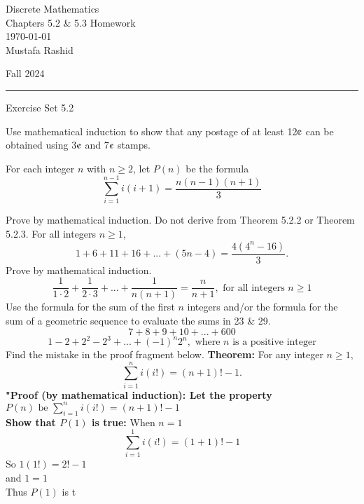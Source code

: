 \documentclass[12pt,letterpaper, onecolumn]{exam}
\begin{document}
	
	\begingroup  
	\noindent\LARGE Discrete Mathematics\\
	\noindent\LARGE Chapters 5.2 \& 5.3 Homework\\
	\noindent\large \today\\
	\noindent\large Mustafa Rashid\par
	\noindent\large Fall 2024\par
	\endgroup
	\rule{\textwidth}{0.4pt}
	\pointsdroppedatright
	\printanswers
	\renewcommand{\solutiontitle}{\noindent\textbf{Ans:}\enspace}  
	
	\centering\large Exercise Set 5.2\\
	\begin{questions}
		\setcounter{question}{1} \question  Use mathematical induction to show that any postage of at least 12$\mbox{\textcentoldstyle}$ can be obtained using 3$\mbox{\textcentoldstyle}$   and 7$\mbox{\textcentoldstyle}$  stamps.
		
		\setcounter{question}{3}\question  For each integer $n$ with $n\geq2$, let $P(n)$ be the formula
		$$\sum_{i=1}^{n-1}i(i+1)=\frac{n(n-1)(n+1)}{3}$$
		Prove by mathematical induction. Do not derive from Theorem 5.2.2 or Theorem 5.2.3.
		\setcounter{question}{6}\question For all integers $n\geq1$,
		$$1+6+11+16+...+(5n-4)=\frac{4(4^n-16)}{3}.$$
		Prove by mathematical induction.
		\setcounter{question}{11}\question $$\frac{1}{1\cdot2}+\frac{1}{2\cdot3}+...+\frac{1}{n(n+1)}=\frac{n}{n+1}, \textrm{ for all integers $n\geq1$}$$
		Use the formula for the sum of the first $n$ integers and/or the formula for the sum of a geometric sequence to evaluate the sums in 23 \& 29.
		\setcounter{question}{22}\question $$7+8+9+10+...+600$$
		\setcounter{question}{28}\question $$1-2+2^2-2^3+...+(-1)^n2^n, \textrm{ where $n$ is a positive integer}$$
		Find the mistake in the proof fragment below.
		\setcounter{question}{34}\question \textbf{Theorem:} For any integer $n\geq1,$
		$$\sum_{i=1}^{n}i(i!)=(n+1)!-1.$$
		\textbf{"Proof (by mathematical induction): Let the property} $P(n) \textrm{ be } \sum_{i=1}^{n}i(i!)=(n+1)!-1$\\
		\textbf{Show that $P(1)$ is true:} When $n=1$
		$$\sum_{i=1}^{1}i(i!)=(1+1)!-1$$
		So $1(1!)=2!-1$\\
		and $1=1$\\
		Thus $P(1)$ is t
	\end{questions}
\end{document}
